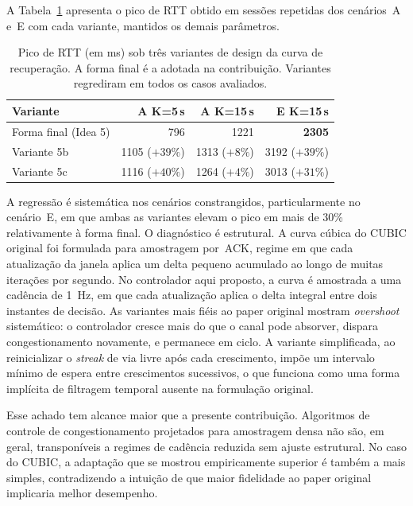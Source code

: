 A Tabela~\ref{tab:sensitivity} apresenta o pico de RTT obtido
em sessões repetidas dos cenários~A e~E com cada variante,
mantidos os demais parâmetros.

\begin{table}[!t]
  \caption{Pico de RTT (em ms) sob três variantes de design da
  curva de recuperação. A forma final é a adotada na
  contribuição. Variantes regrediram em todos os casos
  avaliados.}
  \label{tab:sensitivity}
  \centering
  \begin{tabular}{lrrr}
    \toprule
    \textbf{Variante} & \textbf{A K=5\,s} & \textbf{A K=15\,s} & \textbf{E K=15\,s} \\
    \midrule
    Forma final (Idea 5)  & 796   & 1221  & \textbf{2305} \\
    Variante 5b           & 1105 \scriptsize($+39\%$) & 1313 \scriptsize($+8\%$)  & 3192 \scriptsize($+39\%$) \\
    Variante 5c           & 1116 \scriptsize($+40\%$) & 1264 \scriptsize($+4\%$)  & 3013 \scriptsize($+31\%$) \\
    \bottomrule
  \end{tabular}
\end{table}

A regressão é sistemática nos cenários constrangidos,
particularmente no cenário~E, em que ambas as variantes
elevam o pico em mais de 30\% relativamente à forma final. O
diagnóstico é estrutural. A curva cúbica do CUBIC original foi
formulada para amostragem por~ACK, regime em que cada
atualização da janela aplica um delta pequeno acumulado ao
longo de muitas iterações por segundo. No controlador aqui
proposto, a curva é amostrada a uma cadência de 1~Hz, em que
cada atualização aplica o delta integral entre dois instantes
de decisão. As variantes mais fiéis ao paper original mostram
\emph{overshoot} sistemático: o controlador cresce mais do que
o canal pode absorver, dispara congestionamento novamente, e
permanece em ciclo. A variante simplificada, ao reinicializar
o \emph{streak} de via livre após cada crescimento, impõe um
intervalo mínimo de espera entre crescimentos sucessivos, o
que funciona como uma forma implícita de filtragem temporal
ausente na formulação original.

Esse achado tem alcance maior que a presente contribuição.
Algoritmos de controle de congestionamento projetados para
amostragem densa não são, em geral, transponíveis a regimes de
cadência reduzida sem ajuste estrutural. No caso do CUBIC, a
adaptação que se mostrou empiricamente superior é também a
mais simples, contradizendo a intuição de que maior fidelidade
ao paper original implicaria melhor desempenho.

